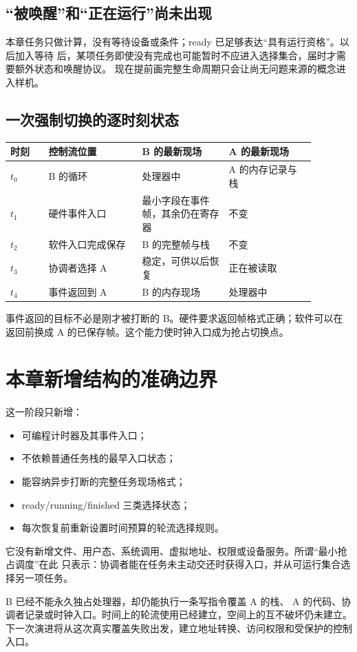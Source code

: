 \subsection{“被唤醒”和“正在运行”尚未出现}

本章任务只做计算，没有等待设备或条件；ready 已足够表达“具有运行资格”。以后加入等待
后，某项任务即使没有完成也可能暂时不应进入选择集合，届时才需要额外状态和唤醒协议。
现在提前画完整生命周期只会让尚无问题来源的概念进入样机。

\subsection{一次强制切换的逐时刻状态}

\begin{longtable}{|L{0.11\linewidth}|L{0.27\linewidth}|L{0.25\linewidth}|L{0.25\linewidth}|}
\hline
{}
时刻 & 控制流位置 & B 的最新现场 & A 的最新现场 \\ \hline
\(t_0\) & B 的循环 & 处理器中 & A 的内存记录与栈 \\ \hline
\(t_1\) & 硬件事件入口 & 最小字段在事件帧，其余仍在寄存器 & 不变 \\ \hline
\(t_2\) & 软件入口完成保存 & B 的完整帧与栈 & 不变 \\ \hline
\(t_3\) & 协调者选择 A & 稳定，可供以后恢复 & 正在被读取 \\ \hline
\(t_4\) & 事件返回到 A & B 的内存现场 & 处理器中 \\ \hline
\end{longtable}

事件返回的目标不必是刚才被打断的 B。硬件要求返回帧格式正确；软件可以在返回前换成 A
的已保存帧。这个能力使时钟入口成为抢占切换点。

\section{本章新增结构的准确边界}

这一阶段只新增：

\begin{itemize}
\item 可编程计时器及其事件入口；
\item 不依赖普通任务栈的最早入口状态；
\item 能容纳异步打断的完整任务现场格式；
\item ready/running/finished 三类选择状态；
\item 每次恢复前重新设置时间预算的轮流选择规则。
\end{itemize}

它没有新增文件、用户态、系统调用、虚拟地址、权限或设备服务。所谓“最小抢占调度”在此
只表示：协调者能在任务未主动交还时获得入口，并从可运行集合选择另一项任务。

B 已经不能永久独占处理器，却仍能执行一条写指令覆盖 A 的栈、
A 的代码、协调者记录或时钟入口。时间上的轮流使用已经建立，空间上的互不破坏仍未建立。
下一次演进将从这次真实覆盖失败出发，建立地址转换、访问权限和受保护的控制入口。
